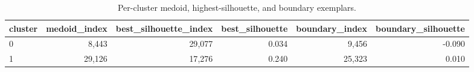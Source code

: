\begin{table}[htbp]
\centering
\begin{tabular}{lrrrrr}
\toprule
cluster & medoid\_index & best\_silhouette\_index & best\_silhouette & boundary\_index & boundary\_silhouette \\
\midrule
0 & 8{,}443 & 29{,}077 & 0.034 & 9{,}456 & -0.090 \\
1 & 29{,}126 & 17{,}276 & 0.240 & 25{,}323 & 0.010 \\
\bottomrule
\end{tabular}
\caption{Per-cluster medoid, highest-silhouette, and boundary exemplars.}
\label{tab:exemplars}
\end{table}
